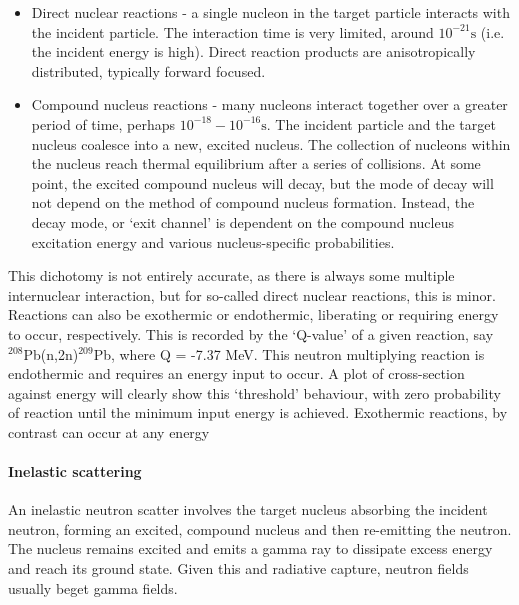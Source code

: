 \begin{itemize}
  \item Direct nuclear reactions - a single nucleon in the target particle interacts with the incident particle. The interaction time is very limited, around $10^{-21}\mathrm{s}$ (i.e. the incident energy is high). Direct reaction products are anisotropically distributed, typically forward focused.
  \item Compound nucleus reactions - many nucleons interact together over a greater period of time, perhaps $10^{-18} - 10^{-16}\mathrm{s}$. The incident particle and the target nucleus coalesce into a new, excited nucleus. The collection of nucleons within the nucleus reach thermal equilibrium after a series of collisions. At some point, the excited compound nucleus will decay, but the mode of decay will not depend on the method of compound nucleus formation. Instead, the decay mode, or `exit channel' is dependent on the compound nucleus excitation energy and various nucleus-specific probabilities. 
\end{itemize} 

This dichotomy is not entirely accurate, as there is always some multiple internuclear interaction, but for so-called direct nuclear reactions, this is minor. Reactions can also be exothermic or endothermic, liberating or requiring energy to occur, respectively. This is recorded by the `Q-value' of a given reaction, say $^{208}$Pb(n,2n)$^{209}$Pb, where Q = -7.37 MeV. This neutron multiplying reaction is endothermic and requires an energy input to occur. A plot of cross-section against energy will clearly show this `threshold' behaviour, with zero probability of reaction until the minimum input energy is achieved. Exothermic reactions, by contrast can occur at any energy 


\paragraph{Inelastic scattering}
An inelastic neutron scatter involves the target nucleus absorbing the incident neutron, forming an excited, compound nucleus and then re-emitting the neutron. The nucleus remains excited and emits a gamma ray to dissipate excess energy and reach its ground state. Given this and radiative capture, neutron fields usually beget gamma fields.

